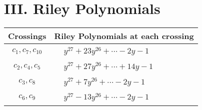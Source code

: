\documentclass[1p]{elsarticle_modified}
\theoremstyle{definition}
\begin{document}
\centering \section*{ III. Riley Polynomials}
\begin{tabular}{m{50pt}|m{274pt}}
Crossings & \hspace{64pt}Riley Polynomials at each crossing \\
\hline $$\begin{aligned}c_{1},c_{7},c_{10}\end{aligned}$$&$\begin{aligned}
&y^{27}+23 y^{26}+\cdots-2 y-1
\end{aligned}$\\
\hline $$\begin{aligned}c_{2},c_{4},c_{5}\end{aligned}$$&$\begin{aligned}
&y^{27}+27 y^{26}+\cdots+14 y-1
\end{aligned}$\\
\hline $$\begin{aligned}c_{3},c_{8}\end{aligned}$$&$\begin{aligned}
&y^{27}+7 y^{26}+\cdots-2 y-1
\end{aligned}$\\
\hline $$\begin{aligned}c_{6},c_{9}\end{aligned}$$&$\begin{aligned}
&y^{27}-13 y^{26}+\cdots-2 y-1
\end{aligned}$\\
\hline
\end{tabular}
\vskip 2pc
\end{document}
